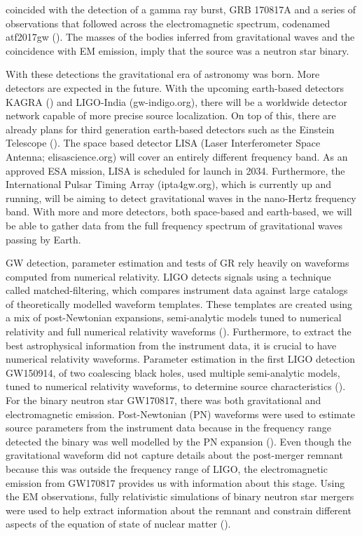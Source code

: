 coincided with the detection of a gamma ray burst, GRB 170817A and a series of observations that followed across the electromagnetic spectrum, codenamed atf2017gw (\citet*{villar:2017wcc}). The masses of the bodies inferred from gravitational waves and the coincidence with EM emission, imply that the source was a neutron star binary.

With these detections the gravitational era of astronomy was born. More detectors are expected in the future. With the upcoming earth-based detectors KAGRA (\citet*{somiya2012detector}) and LIGO-India (gw-indigo.org), there will be a worldwide detector network capable of more precise source localization. On top of this, there are already plans for third generation earth-based detectors such as the Einstein Telescope (\cite{einsteintelescope}). The space based detector LISA (Laser Interferometer Space Antenna; elisascience.org) will cover an entirely different frequency band. As an approved ESA mission, LISA is scheduled for launch in 2034. Furthermore, the International Pulsar Timing Array (ipta4gw.org), which is currently up and running, will be aiming to detect gravitational waves in the nano-Hertz frequency band.  With more and more detectors, both space-based and earth-based, we will be able to gather data from the full frequency spectrum of gravitational waves passing by Earth.

GW detection, parameter estimation and tests of GR rely heavily on waveforms computed from numerical relativity. LIGO detects signals using a technique called matched-filtering, which compares instrument data against large catalogs of theoretically modelled waveform templates. These templates are created using a mix of post-Newtonian expansions, semi-analytic models tuned to numerical relativity and full numerical relativity waveforms (\citet*{sachdev2019gstlal}). Furthermore, to extract the best astrophysical information from the instrument data, it is crucial to have numerical relativity waveforms. Parameter estimation in the first LIGO detection GW150914, of two coalescing black holes, used multiple semi-analytic models, tuned to numerical relativity waveforms, to determine source characteristics (\cite{abbott2016improved}). For the binary neutron star GW170817, there was both gravitational and electromagnetic emission. Post-Newtonian (PN) waveforms were used to estimate source parameters from the instrument data because in the frequency range detected the binary was well modelled by the PN expansion (\cite{abbott2017gw170817}). Even though the gravitational waveform did not capture details about the post-merger remnant because this was outside the frequency range of LIGO, the electromagnetic emission from GW170817 provides us with information about this stage. Using the EM observations, fully relativistic simulations of binary neutron star mergers were used to help extract information about the remnant and constrain different aspects of the equation of state of nuclear matter (\citet*{radice2017gw170817,shibata2017gw170817}). 

